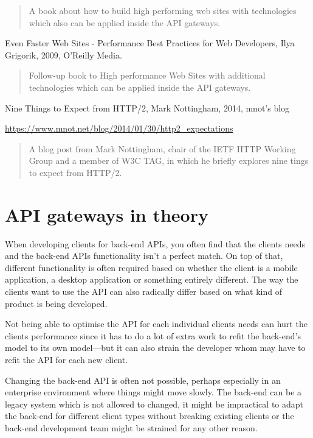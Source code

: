 \documentclass{cslthse-msc}
\begin{document}
\begin{quote}
	A book about how to build high performing web sites with technologies which also can be applied inside the API gateways.
\end{quote}

\vspace{5mm}
\noindent Even Faster Web Sites - Performance Best Practices for Web Developers, Ilya Grigorik, 2009, O'Reilly Media.

\begin{quote}
	Follow-up book to High performance Web Sites with additional technologies which can be applied inside the API gateways.
\end{quote}

\vspace{5mm}
\noindent Nine Things to Expect from HTTP/2, Mark Nottingham, 2014, mnot's blog

\noindent \url{https://www.mnot.net/blog/2014/01/30/http2_expectations}

\begin{quote}
	A blog post from Mark Nottingham, chair of the IETF HTTP Working Group and a member of W3C TAG, in which he briefly explores nine tings to expect from HTTP/2.
\end{quote}

\chapter{API gateways in theory}
When developing clients for back-end APIs, you often find that the clients needs and the back-end APIs functionality isn't a perfect match. On top of that, different functionality is often required based on whether the client is a mobile application, a desktop application or something entirely different. The way the clients want to use the API can also radically differ based on what kind of product is being developed.

Not being able to optimise the API for each individual clients needs can hurt the clients performance since it has to do a lot of extra work to refit the back-end's model to its own model---but it can also strain the developer whom may have to refit the API for each new client.

Changing the back-end API is often not possible, perhaps especially in an enterprise environment where things might move slowly. The back-end can be a legacy system which is not allowed to changed, it might be impractical to adapt the back-end for different client types without breaking existing clients or the back-end development team might be strained for any other reason. 
\end{document}

